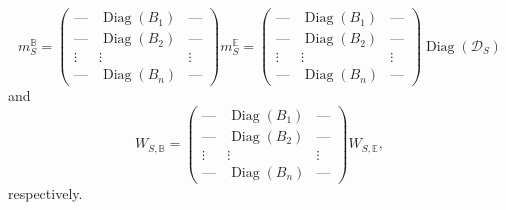 \documentclass[12pt,a4paper]{article}
\def\calD{\mathcal D}
\DeclareMathOperator{\Diag}{Diag}
\numberwithin{equation}{section}
\begin{document}
\begin{equation}\label{momento ej cambio de base}
	m_S^{\mathbb{B}}= \begin{pmatrix}
		\text{---}&\Diag(B_1)&\text{---}\\
		\text{---}&\Diag(B_2)&\text{---}\\
		\vdots&\vdots&\vdots\\
		\text{---}&\Diag(B_n)&\text{---}
	\end{pmatrix}m_S^{\mathbb{E}}= \begin{pmatrix}
	\text{---}&\Diag(B_1)&\text{---}\\
	\text{---}&\Diag(B_2)&\text{---}\\
	\vdots&\vdots&\vdots\\
	\text{---}&\Diag(B_n)&\text{---}
	\end{pmatrix} \Diag(\calD_{S})
\end{equation}
and
\begin{equation}\label{jnr ej cambio de base}
	W_{S,\mathbb{B}}= \begin{pmatrix}
		\text{---}&\Diag(B_1)&\text{---}\\
		\text{---}&\Diag(B_2)&\text{---}\\
		\vdots&\vdots&\vdots\\
		\text{---}&\Diag(B_n)&\text{---}
	\end{pmatrix}W_{S,\mathbb{E}},
\end{equation}
respectively.
\end{document}
